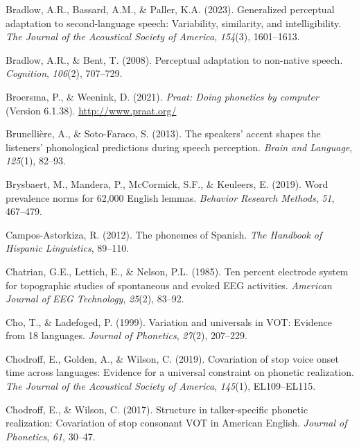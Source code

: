 \documentclass[
  12pt,
  twoside]{article}
\newlength{\cslhangindent}
\newlength{\cslentryspacingunit} %
\newenvironment{CSLReferences}[2] %
 {%
  \setlength{\parindent}{0pt}
  \ifodd #1
  \let\oldpar\par
  \def\par{\hangindent=\cslhangindent\oldpar}
  \fi
  \setlength{\parskip}{#2\cslentryspacingunit}
 }%
 {}
\begin{document}
\begin{CSLReferences}{1}{0}
\leavevmode{}%
Bradlow, A.R., Bassard, A.M., \& Paller, K.A. (2023). Generalized perceptual adaptation to second-language speech: Variability, similarity, and intelligibility. \emph{The Journal of the Acoustical Society of America}, \emph{154}(3), 1601--1613.

\leavevmode{}%
Bradlow, A.R., \& Bent, T. (2008). Perceptual adaptation to non-native speech. \emph{Cognition}, \emph{106}(2), 707--729.

\leavevmode{}%
Broersma, P., \& Weenink, D. (2021). \emph{Praat: Doing phonetics by computer} (Version 6.1.38). \url{http://www.praat.org/}

\leavevmode{}%
Brunellière, A., \& Soto-Faraco, S. (2013). The speakers' accent shapes the listeners' phonological predictions during speech perception. \emph{Brain and Language}, \emph{125}(1), 82--93.

\leavevmode{}%
Brysbaert, M., Mandera, P., McCormick, S.F., \& Keuleers, E. (2019). Word prevalence norms for 62,000 {English} lemmas. \emph{Behavior Research Methods}, \emph{51}, 467--479.

\leavevmode{}%
Campos-Astorkiza, R. (2012). The phonemes of {Spanish}. \emph{The Handbook of Hispanic Linguistics}, 89--110.

\leavevmode{}%
Chatrian, G.E., Lettich, E., \& Nelson, P.L. (1985). Ten percent electrode system for topographic studies of spontaneous and evoked EEG activities. \emph{American Journal of EEG Technology}, \emph{25}(2), 83--92.

\leavevmode{}%
Cho, T., \& Ladefoged, P. (1999). Variation and universals in {VOT}: Evidence from 18 languages. \emph{Journal of Phonetics}, \emph{27}(2), 207--229.

\leavevmode{}%
Chodroff, E., Golden, A., \& Wilson, C. (2019). Covariation of stop voice onset time across languages: Evidence for a universal constraint on phonetic realization. \emph{The Journal of the Acoustical Society of America}, \emph{145}(1), EL109--EL115.

\leavevmode{}%
Chodroff, E., \& Wilson, C. (2017). Structure in talker-specific phonetic realization: Covariation of stop consonant {VOT in American English}. \emph{Journal of Phonetics}, \emph{61}, 30--47.


\end{CSLReferences}
\end{document}
